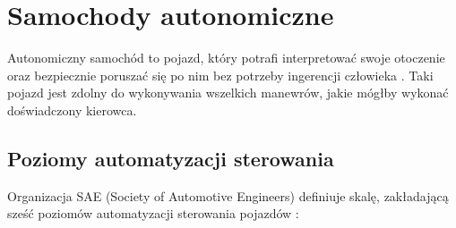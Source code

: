 \chapter{Samochody autonomiczne}
Autonomiczny samochód to pojazd, który potrafi interpretować swoje otoczenie oraz bezpiecznie poruszać się po nim bez potrzeby ingerencji człowieka \cite{synopsys:whatIsAutonomousCar}. Taki pojazd jest zdolny do wykonywania wszelkich manewrów, jakie mógłby wykonać doświadczony kierowca.

\section{Poziomy automatyzacji sterowania}
Organizacja SAE (Society of Automotive Engineers) definiuje skalę, zakładającą sześć poziomów automatyzacji sterowania pojazdów \cite{synopsys:sixLevelsOfCarAutonomy}:
